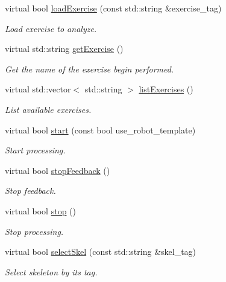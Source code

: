 \begin{DoxyCompactItemize}
\item 
virtual bool \mbox{\hyperlink{classmotionAnalyzer__IDL_a656d8a9edd690c651cb1079cfa697c10}{load\+Exercise}} (const std\+::string \&exercise\+\_\+tag)
\begin{DoxyCompactList}\small\item\em Load exercise to analyze. \end{DoxyCompactList}\item 
virtual std\+::string \mbox{\hyperlink{classmotionAnalyzer__IDL_a7e2b015cc7bd121d789e33980505f630}{get\+Exercise}} ()
\begin{DoxyCompactList}\small\item\em Get the name of the exercise begin performed. \end{DoxyCompactList}\item 
virtual std\+::vector$<$ std\+::string $>$ \mbox{\hyperlink{classmotionAnalyzer__IDL_ac62e7b2af278d353c3701d87aca8af2b}{list\+Exercises}} ()
\begin{DoxyCompactList}\small\item\em List available exercises. \end{DoxyCompactList}\item 
virtual bool \mbox{\hyperlink{classmotionAnalyzer__IDL_aeebeafd8986b78e720eb1c6eba09207e}{start}} (const bool use\+\_\+robot\+\_\+template)
\begin{DoxyCompactList}\small\item\em Start processing. \end{DoxyCompactList}\item 
virtual bool \mbox{\hyperlink{classmotionAnalyzer__IDL_a6753e9b8772e76ed6fbb4d39616f1423}{stop\+Feedback}} ()
\begin{DoxyCompactList}\small\item\em Stop feedback. \end{DoxyCompactList}\item 
virtual bool \mbox{\hyperlink{classmotionAnalyzer__IDL_affddad47070a4fdb10357c10037f39f5}{stop}} ()
\begin{DoxyCompactList}\small\item\em Stop processing. \end{DoxyCompactList}\item 
virtual bool \mbox{\hyperlink{classmotionAnalyzer__IDL_a158f8a856611aa5d4bcab9adc9c67a5d}{select\+Skel}} (const std\+::string \&skel\+\_\+tag)
\begin{DoxyCompactList}\small\item\em Select skeleton by its tag. \end{DoxyCompactList}\item 

\end{DoxyCompactItemize}
